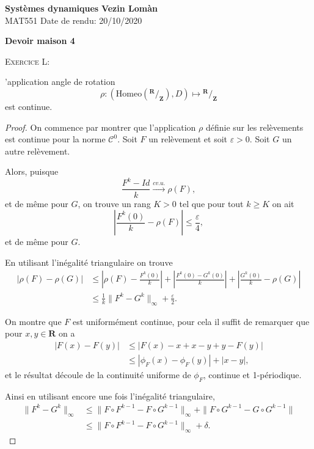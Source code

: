 \documentclass[12pt]{article}
\newenvironment{ex}[1]
{\begin{mdframed}[linewidth=0.6pt]
        \textsc{Exercice #1:}

}
    {\end{mdframed}}
\newcommand{\R}{\mathbf{R}}
\newcommand{\Z}{\mathbf{Z}}
\newcommand*\quot[2]{{^{\textstyle #1}\big/_{\textstyle #2}}}
\theoremstyle{remark}
\begin{document}
        \noindent
\textbf{Systèmes dynamiques} \hfill \textbf{Vezin Lomàn}\\
\normalsize MAT551 \hfill Date de rendu: 20/10/2020\\

\begin{center}
\textbf{Devoir maison 4}
\end{center}
        
\begin{ex}{1}
        L'application angle de rotation \[
        \rho : (\mathrm{Homeo}(\quot{\R}{\Z}), D) \longmapsto \quot{\R}{\Z}
        \] est continue.
\end{ex}
\begin{proof}
        On commence par montrer que l'application $\rho$ définie sur les relèvements est continue pour la norme $\mathcal{C}^{0}$.
        Soit $F$ un relèvement et soit $\varepsilon > 0$. Soit $G$ un autre relèvement.

        Alors, puisque  \[
        \frac{F^{k}-Id}{k} \overset{cv.u.}{\longrightarrow} \rho(F)
        ,\] et de même pour $G$, on trouve un rang $K > 0$ tel que pour tout $k \ge K$ on ait \[
        |\frac{F^{k}(0)}{k} - \rho(F)| \le \frac{\varepsilon}{4}
        ,\] et de même pour $G$.

        En utilisant l'inégalité triangulaire on trouve
        \begin{align*}
                |\rho(F)-\rho(G)| &\le |\rho(F) - \frac{F^{k}(0)}{k}| + |\frac{F^{k}(0)-G^{k}(0)}{k}| + |\frac{G^{k}(0)}{k} - \rho(G)| \\
                                  &\le \frac{1}{k}\|F^{k}-G^{k}\|_{\infty} + \frac{\varepsilon}{2}
        .\end{align*}

        On montre que $F$ est uniformément continue, pour cela il suffit de remarquer que pour $x, y \in \R$ on a 
        \begin{align*}
                |F(x)-F(y)| &\le |F(x)-x+x-y+y-F(y)| \\
                            &\le |\phi_{F}(x) - \phi_{F}(y)| + |x-y|
        ,\end{align*} et le résultat découle de la continuité uniforme de $\phi_{F}$, continue et 1-périodique.

        Ainsi en utilisant encore une fois l'inégalité triangulaire,
        \begin{align*}
                \|F^{k}-G^{k}\|_{\infty} &\le \|F\circ F^{k-1} - F\circ G^{k-1}\|_{\infty} + \|F\circ G^{k-1} - G\circ G^{k-1}\| \\
                                         &\le \|F\circ F^{k-1} - F\circ G^{k-1}\|_{\infty} + \delta 
        .\end{align*}


\end{proof}
\end{document}
